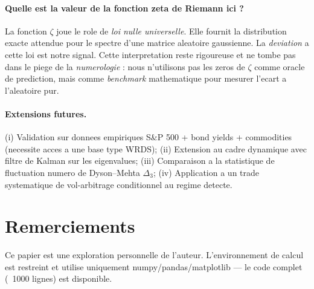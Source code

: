\documentclass[11pt,a4paper]{article}
\begin{document}
\paragraph{Quelle est la valeur de la fonction zeta de Riemann ici ?}
La fonction $\zeta$ joue le role de \emph{loi nulle universelle}. Elle fournit la distribution exacte attendue pour le spectre d'une matrice aleatoire gaussienne. La \emph{deviation} a cette loi est notre signal. Cette interpretation reste rigoureuse et ne tombe pas dans le piege de la \emph{numerologie} : nous n'utilisons pas les zeros de $\zeta$ comme oracle de prediction, mais comme \emph{benchmark} mathematique pour mesurer l'ecart a l'aleatoire pur.

\paragraph{Extensions futures.}
(i) Validation sur donnees empiriques S\&P 500 + bond yields + commodities (necessite acces a une base type WRDS); (ii) Extension au cadre dynamique avec filtre de Kalman sur les eigenvalues; (iii) Comparaison a la statistique de fluctuation numero de Dyson--Mehta $\Delta_3$; (iv) Application a un trade systematique de vol-arbitrage conditionnel au regime detecte.

\section*{Remerciements}

\noindent Ce papier est une exploration personnelle de l'auteur. L'environnement de calcul est restreint et utilise uniquement numpy/pandas/matplotlib --- le code complet (~1000 lignes) est disponible.
\end{document}

